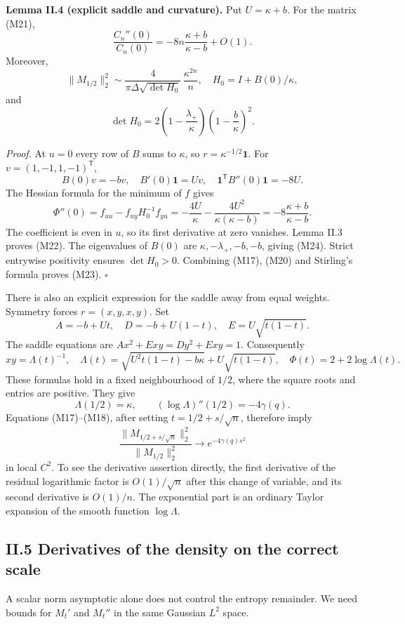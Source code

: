 \documentclass[
  british,
  10pt,
]{article}
\begin{document}
\textbf{Lemma II.4 (explicit saddle and curvature).} Put \(U=\kappa+b\).
For the matrix (M21), \[
\frac{C_n''(0)}{C_n(0)}
=-8n\frac{\kappa+b}{\kappa-b}+O(1).
\tag{M22}
\] Moreover, \[
\|M_{1/2}\|_2^2
\sim \frac{4}{\pi\Delta\sqrt{\det H_0}}\,
          \frac{\kappa^{2n}}n,
\quad
H_0=I+B(0)/\kappa,
\tag{M23}
\] and \[
\det H_0=
2\left(1-\frac{\lambda_+}{\kappa}\right)
 \left(1-\frac b\kappa\right)^2.
\tag{M24}
\]

\emph{Proof.} At \(u=0\) every row of \(B\) sums to \(\kappa\), so
\(r=\kappa^{-1/2}\mathbf1\). For \(v=(1,-1,1,-1)^{\mathsf T}\), \[
B(0)v=-bv,\quad B'(0)\mathbf1=Uv,\quad
\mathbf1^{\mathsf T}B''(0)\mathbf1=-8U.
\] The Hessian formula for the minimum of \(f\) gives \[
\Phi''(0)=f_{uu}-f_{uy}H_0^{-1}f_{yu}
=-\frac{4U}{\kappa}
 -\frac{4U^2}{\kappa(\kappa-b)}
=-8\frac{\kappa+b}{\kappa-b}.
\] The coefficient is even in \(u\), so its first derivative at zero
vanishes. Lemma II.3 proves (M22). The eigenvalues of \(B(0)\) are
\(\kappa,-\lambda_+,-b,-b\), giving (M24). Strict entrywise positivity
ensures \(\det H_0>0\). Combining (M17), (M20) and Stirling's formula
proves (M23). \(\square\)

There is also an explicit expression for the saddle away from equal
weights. Symmetry forces \(r=(x,y,x,y)\). Set \[
A=-b+Ut,\quad D=-b+U(1-t),\quad E=U\sqrt{t(1-t)}.
\] The saddle equations are \(Ax^2+Exy=Dy^2+Exy=1\). Consequently \[
xy=\Lambda(t)^{-1},\quad
\Lambda(t)=\sqrt{U^2t(1-t)-b\kappa}
             +U\sqrt{t(1-t)},
\quad
\Phi(t)=2+2\log\Lambda(t).
\tag{M25}
\] These formulas hold in a fixed neighbourhood of \(1/2\), where the
square roots and entries are positive. They give \[
\Lambda(1/2)=\kappa,\qquad
(\log\Lambda)''(1/2)=-4\gamma(q).
\] Equations (M17)--(M18), after setting \(t=1/2+s/\sqrt n\), therefore
imply \[
\frac{\|M_{1/2+s/\sqrt n}\|_2^2}
     {\|M_{1/2}\|_2^2}
\longrightarrow e^{-4\gamma(q)s^2}
\tag{M26}
\] in local \(C^2\). To see the derivative assertion directly, the first
derivative of the residual logarithmic factor is \(O(1)/\sqrt n\) after
this change of variable, and its second derivative is \(O(1)/n\). The
exponential part is an ordinary Taylor expansion of the smooth function
\(\log\Lambda\).

\subsection{II.5 Derivatives of the density on the correct
scale}\label{ii.5-derivatives-of-the-density-on-the-correct-scale}

A scalar norm asymptotic alone does not control the entropy remainder.
We need bounds for \(M_t'\) and \(M_t''\) in the same Gaussian \(L^2\)
space.
\end{document}

